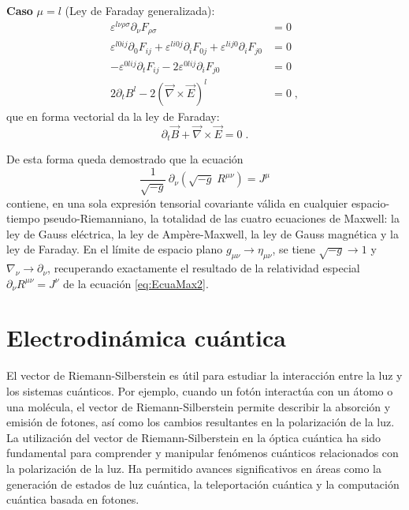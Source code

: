                 \textbf{Caso} $\mu=l$ (Ley de Faraday generalizada):
                \begin{align*}
                    \varepsilon^{l\nu\rho\sigma}\partial_{\nu}F_{\rho\sigma} &= 0\\
                    \varepsilon^{l0ij}\partial_0 F_{ij} +\varepsilon^{li0j}\partial_i F_{0j} +\varepsilon^{lij0}\partial_i F_{j0} &= 0\\
                    -\varepsilon^{0lij}\partial_t F_{ij}  -2\varepsilon^{0lij}\partial_i F_{j0} &= 0\\
                    2\partial_t B^l - 2(\vec{\nabla}\times\vec{E})^l &= 0\;,
                \end{align*}
                que en forma vectorial da la ley de Faraday:
                \begin{equation}
                    \partial_t\vec{B} + \vec{\nabla}\times\vec{E} = 0\;.
                \end{equation}

            De esta forma queda demostrado que la ecuación
            \begin{equation*}
                \frac{1}{\sqrt{-g}}\,\partial_{\nu}\!\left(\sqrt{-g}\;R^{\mu\nu}\right) = J^{\mu}
            \end{equation*}
            contiene, en una sola expresión tensorial covariante válida en cualquier espacio-tiempo pseudo-Riemanniano, la totalidad de las cuatro ecuaciones de Maxwell: la ley de Gauss eléctrica, la ley de Ampère-Maxwell, la ley de Gauss magnética y la ley de Faraday.  En el límite de espacio plano $g_{\mu\nu}\to \eta_{\mu\nu}$, se tiene $\sqrt{-g}\to1$ y $\nabla_{\nu}\to\partial_{\nu}$, recuperando exactamente el resultado de la relatividad especial $\partial_{\nu}R^{\mu\nu}=J^{\nu}$ de la ecuación \eqref{eq:EcuaMax2}.

    \section{Electrodinámica cuántica}

        El vector de Riemann-Silberstein es útil para estudiar la interacción entre la luz y los sistemas cuánticos. Por ejemplo, cuando un fotón interactúa con un átomo o una molécula, el vector de Riemann-Silberstein permite describir la absorción y emisión de fotones, así como los cambios resultantes en la polarización de la luz. La utilización del vector de Riemann-Silberstein en la óptica cuántica ha sido fundamental para comprender y manipular fenómenos cuánticos relacionados con la polarización de la luz. Ha permitido avances significativos en áreas como la generación de estados de luz cuántica, la teleportación cuántica y la computación cuántica basada en fotones. \\

